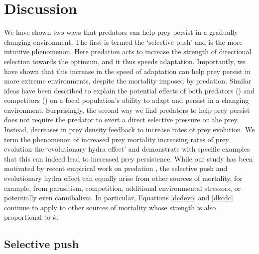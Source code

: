 \documentclass[11pt]{article}
\begin{document}
\section*{Discussion}

We have shown two ways that predators can help prey persist in a gradually changing environment. 
The first is termed the `selective push' and is the more intuitive phenomenon.
Here predation acts to increase the strength of directional selection towards the optimum, and it thus speeds adaptation.
Importantly, we have shown that this increase in the speed of adaptation can help prey persist in more extreme environments, despite the mortality imposed by predation.
Similar ideas have been described to explain the potential effects of both predators (\citealt{Jones2008}) and competitors (\citealt{Osmond2013}) on a focal population's ability to adapt and persist in a changing environment.
Surprisingly, the second way we find predators to help prey persist does not require the predator to exert a direct selective pressure on the prey.
Instead, decreases in prey density feedback to increase rates of prey evolution.
We term the phenomenon of increased prey mortality increasing rates of prey evolution the `evolutionary hydra effect' and demonstrate with specific examples that this can indeed lead to increased prey persistence.
While our study has been motivated by recent empirical work on predation \citep{Tseng2015}, the selective push and evolutionary hydra effect can equally arise from other sources of mortality, for example, from parasitism, competition, additional environmental stressors, or potentially even cannibalism.
In particular, Equations \eqref{dcdevo} and \eqref{dkcdc} continue to apply to other sources of mortality whose strength is also proportional to $k$.

\subsection*{Selective push}
\end{document}
